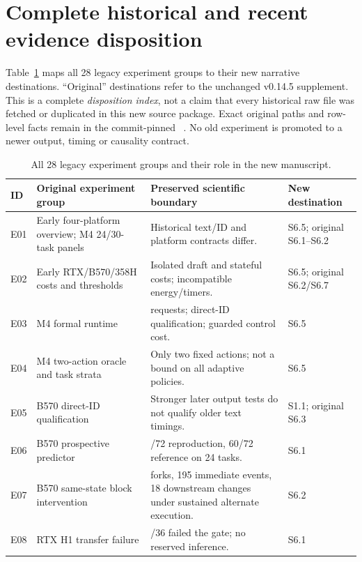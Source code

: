 \section{Complete historical and recent evidence disposition}
\label{supp:ledger}
Table~\ref{tab:ledger} maps all 28 legacy experiment groups to their new narrative destinations. ``Original'' destinations refer to the unchanged v0.14.5 supplement. This is a complete \emph{disposition index}, not a claim that every historical raw file was fetched or duplicated in this new source package. Exact original paths and row-level facts remain in the commit-pinned ~\cite{history}. No old experiment is promoted to a newer output, timing or causality contract.

\begin{table}[tp]\centering\small
\caption{All 28 legacy experiment groups and their role in the new manuscript.}\label{tab:ledger}
\begin{tabular}{@{}>{\raggedright\arraybackslash}p{}>{\raggedright\arraybackslash}p{}>{\raggedright\arraybackslash}p{}>{\raggedright\arraybackslash}p{}@{}}
\toprule ID&Original experiment group&Preserved scientific boundary&New destination\\\midrule
E01 & Early four-platform overview; M4 24/30-task panels & Historical text/ID and platform contracts differ. & S6.5; original S6.1--S6.2\\
E02 & Early RTX/B570/358H costs and thresholds & Isolated draft and stateful costs; incompatible energy/timers. & S6.5; original S6.2/S6.7\\
E03 & M4 formal runtime & 540 requests; direct-ID qualification; guarded control cost. & S6.5\\
E04 & M4 two-action oracle and task strata & Only two fixed actions; not a bound on all adaptive policies. & S6.5\\
E05 & B570 direct-ID qualification & Stronger later output tests do not qualify older text timings. & S1.1; original S6.3\\
E06 & B570 prospective predictor & 72/72 reproduction, 60/72 reference on 24 tasks. & S6.1\\
E07 & B570 same-state block intervention & 72 forks, 195 immediate events, 18 downstream changes under sustained alternate execution. & S6.2\\
E08 & RTX H1 transfer failure & 24/36 failed the gate; no reserved inference. & S6.1\\

\end{tabular}
\end{table}
